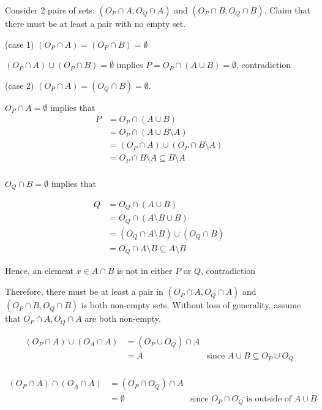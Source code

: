 \documentclass{article}
\begin{document}
Consider 2 pairs of sets: $(O_P \cap A, O_Q \cap A)$ and $(O_P \cap B, O_Q \cap B)$. Claim that there must be at least a pair with no empty set.

(case 1) $(O_P \cap A) = (O_P \cap B) = \emptyset$

$(O_P \cap A) \cup (O_P \cap B) = \emptyset$ implies $P = O_P \cap (A \cup B) = \emptyset$, contradiction

(case 2) $(O_P \cap A) = (O_Q \cap B) = \emptyset$.

$O_P \cap A = \emptyset$ implies that 
\begin{align*}
    P   &= O_P \cap (A \cup B) \\
        &= O_P \cap (A \cup B \setminus A) \\
        &= (O_P \cap A) \cup (O_P \cap B \setminus A) \\
        &= O_P \cap B \setminus A \subseteq B \setminus A \\   
\end{align*}

$O_Q \cap B  = \emptyset$ implies that

\begin{align*}
    Q   &= O_Q \cap (A \cup B) \\
        &= O_Q \cap (A \setminus B \cup B) \\
        &= (O_Q \cap A \setminus B) \cup (O_Q \cap B) \\
        &= O_Q \cap A \setminus B \subseteq A \setminus B    
\end{align*}


Hence, an element $x \in A \cap B$ is not in either $P$ or $Q$, contradiction

Therefore, there must be at least a pair in $(O_P \cap A, O_Q \cap A)$ and $(O_P \cap B, O_Q \cap B)$ is both non-empty sets. Without loss of generality, assume that $O_P \cap A, O_Q \cap A$ are both non-empty.

\begin{align*}
(O_P \cap A) \cup (O_A \cap A)  &= (O_P \cup O_Q) \cap A \\
                                &= A &\text{since $A \cup B \subseteq O_P \cup O_Q$}\\
\end{align*}

\begin{align*}
(O_P \cap A) \cap (O_A \cap A)  &= (O_P \cap O_Q) \cap A \\
                                &= \emptyset &\text{since $O_P \cap O_Q$ is outside of $A \cup B$}\\
\end{align*}
\end{document}
